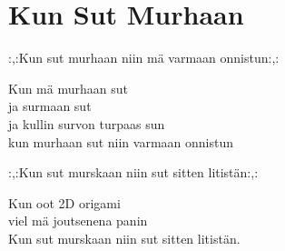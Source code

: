 \section{Kun Sut Murhaan}
:,:Kun sut murhaan niin mä varmaan onnistun:,:

Kun mä murhaan sut\\
ja surmaan sut\\
ja kullin survon turpaas sun\\
kun murhaan sut niin varmaan onnistun

:,:Kun sut murskaan niin sut sitten litistän:,:

Kun oot 2D origami\\
viel mä joutsenena panin\\
Kun sut murskaan niin sut sitten litistän.